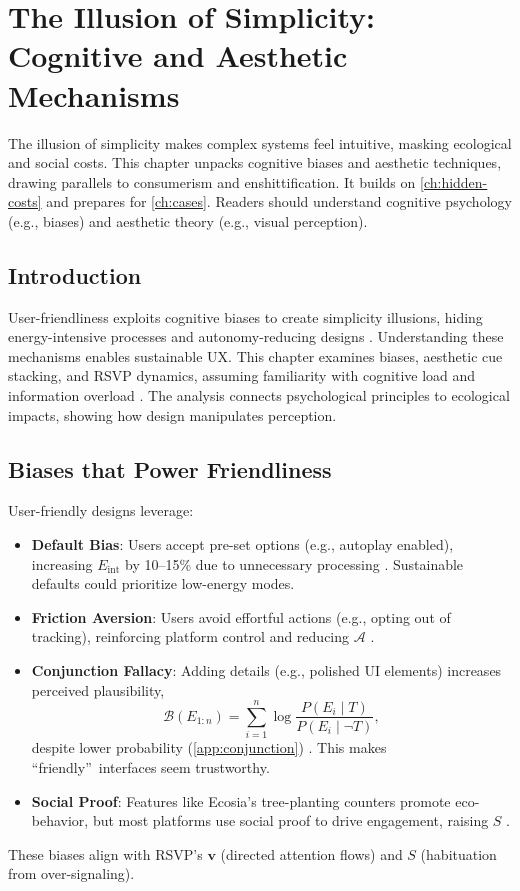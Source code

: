 \documentclass[openany]{book}
\newcommand{\vvec}{\mathbf{v}} %
\newcommand{\Sent}{S} %
\newcommand{\Eint}{E_{\mathrm{int}}} %
\newcommand{\Auton}{\mathcal{A}} %
\begin{document}
\chapter{The Illusion of Simplicity: Cognitive and Aesthetic Mechanisms}
\label{ch:illusion}

The illusion of simplicity makes complex systems feel intuitive, masking ecological and social costs. This chapter unpacks cognitive biases and aesthetic techniques, drawing parallels to consumerism and enshittification. It builds on \cref{ch:hidden-costs} and prepares for \cref{ch:cases}. Readers should understand cognitive psychology (e.g., biases) and aesthetic theory (e.g., visual perception).

\section{Introduction}
\label{sec:illusion-intro}
User-friendliness exploits cognitive biases to create simplicity illusions, hiding energy-intensive processes and autonomy-reducing designs \citep{colak2024,doctorow2022}. Understanding these mechanisms enables sustainable UX. This chapter examines biases, aesthetic cue stacking, and RSVP dynamics, assuming familiarity with cognitive load and information overload \citep{norman1988}. The analysis connects psychological principles to ecological impacts, showing how design manipulates perception.

\section{Biases that Power Friendliness}
\label{sec:biases}
User-friendly designs leverage:
\begin{itemize}
  \item \textbf{Default Bias}: Users accept pre-set options (e.g., autoplay enabled), increasing \(\Eint\) by 10--15\% due to unnecessary processing \citep{colak2024}. Sustainable defaults could prioritize low-energy modes.
  \item \textbf{Friction Aversion}: Users avoid effortful actions (e.g., opting out of tracking), reinforcing platform control and reducing \(\Auton\) \citep{doctorow2022}.
  \item \textbf{Conjunction Fallacy}: Adding details (e.g., polished UI elements) increases perceived plausibility,
  \begin{equation}
  \label{eq:believability}
  \mathcal{B}(E_{1:n}) = \sum_{i=1}^n \log \frac{P(E_i \mid T)}{P(E_i \mid \neg T)},
  \end{equation}
  despite lower probability (\cref{app:conjunction}) \citep{tversky1983}. This makes \textquotedblleft friendly\textquotedblright\ interfaces seem trustworthy.
  \item \textbf{Social Proof}: Features like Ecosia’s tree-planting counters promote eco-behavior, but most platforms use social proof to drive engagement, raising \(\Sent\) \citep{colak2024}.
\end{itemize}
These biases align with RSVP’s \(\vvec\) (directed attention flows) and \(\Sent\) (habituation from over-signaling).
\end{document}
